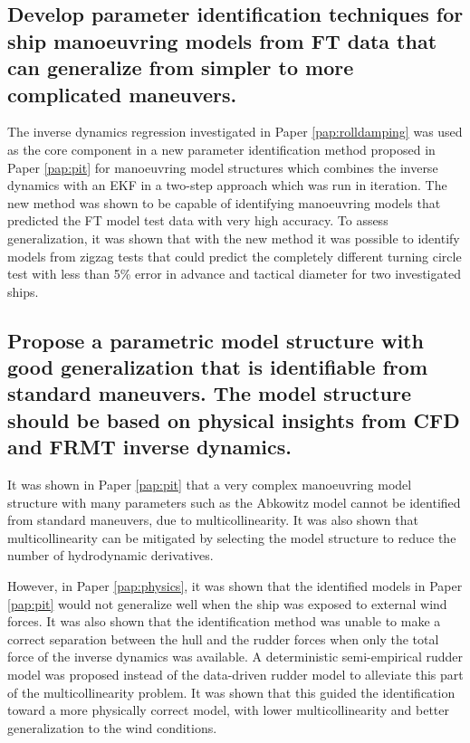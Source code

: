 \subsection*{Develop parameter identification techniques for ship manoeuvring models from FT data that can generalize from simpler to more complicated maneuvers.}
The inverse dynamics regression investigated in Paper \ref{pap:rolldamping} was used as the core component in a new parameter identification method proposed in Paper \ref{pap:pit} for manoeuvring model structures which combines the inverse dynamics with an EKF in a two-step approach \cite{yoonIdentificationHydrodynamicCoefficients2003} which was run in iteration.
The new method was shown to be capable of identifying manoeuvring models that predicted the FT model test data with very high accuracy.
To assess generalization, it was shown that with the new method it was possible to identify models from zigzag tests that could predict the completely different turning circle test with less than 5\% error in advance and tactical diameter for two investigated ships.

\subsection*{Propose a parametric model structure with good generalization that is identifiable from standard maneuvers. The model structure should be based on physical insights from CFD and FRMT inverse dynamics.}
It was shown in Paper \ref{pap:pit}  that a very complex manoeuvring model structure with many parameters such as the Abkowitz model cannot be identified from standard maneuvers, due to multicollinearity.  
It was also shown that multicollinearity can be mitigated by selecting the model structure to reduce the number of hydrodynamic derivatives.

However, in Paper \ref{pap:physics}, it was shown that the identified models in Paper \ref{pap:pit} would not generalize well when the ship was exposed to external wind forces. 
It was also shown that the identification method was unable to make a correct separation between the hull and the rudder forces when only the total force of the inverse dynamics was available. 
A deterministic semi-empirical rudder model was proposed instead of the data-driven rudder model to alleviate this part of the multicollinearity problem. It was shown that this guided the identification toward a more physically correct model, with lower multicollinearity and better generalization to the wind conditions. 

